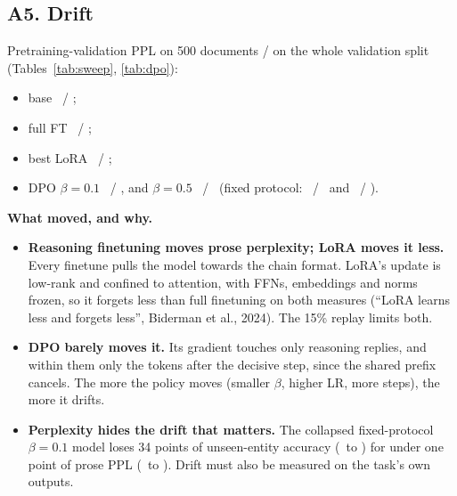 \subsection*{A5. Drift}
Pretraining-validation PPL on 500 documents / on the whole validation split (Tables~\ref{tab:sweep}, \ref{tab:dpo}):
\begin{itemize}[leftmargin=*,nosep]
\item base \PplBase\ / \AdaPplFullBase;
\item full FT \AdaPplFull\ / \AdaPplFullFull;
\item best LoRA \AdaPplBest\ / \AdaPplFullBest;
\item DPO $\beta=0.1$ \AdaDpoLowPpl\ / \AdaDpoLowPplFull, and $\beta=0.5$ \AdaDpoHighPpl\ / \AdaDpoHighPplFull\ (fixed protocol: \AdaFixLowPpl\ / \AdaFixLowPplFull\ and \AdaFixHighPpl\ / \AdaFixHighPplFull).
\end{itemize}
\textbf{What moved, and why.}
\begin{itemize}[leftmargin=*,nosep]
\item \textbf{Reasoning finetuning moves prose perplexity; LoRA moves it less.} Every finetune pulls the model towards the chain format. LoRA's update is low-rank and confined to attention, with FFNs, embeddings and norms frozen, so it forgets less than full finetuning on both measures (``LoRA learns less and forgets less'', Biderman et al., 2024). The 15\% replay limits both.
\item \textbf{DPO barely moves it.} Its gradient touches only reasoning replies, and within them only the tokens after the decisive step, since the shared prefix cancels. The more the policy moves (smaller $\beta$, higher LR, more steps), the more it drifts.
\item \textbf{Perplexity hides the drift that matters.} The collapsed fixed-protocol $\beta=0.1$ model loses 34 points of unseen-entity accuracy (\AdaAccBestUnEnt\ to \AdaFixLowUnEnt) for under one point of prose PPL (\AdaPplBest\ to \AdaFixLowPpl). Drift must also be measured on the task's own outputs.
\end{itemize}
